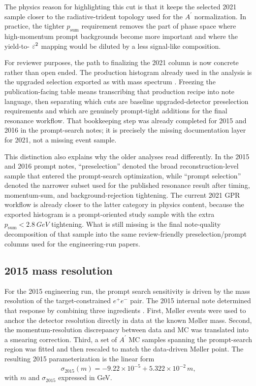 The physics reason for highlighting this cut is that it keeps the selected 2021 sample
closer to the radiative-trident topology used for the $A^\prime$ normalization. In
practice, the tighter $p_{\mathrm{sum}}$ requirement removes the part of phase space
where high-momentum prompt backgrounds become more important and where the yield-to-
$\varepsilon^2$ mapping would be diluted by a less signal-like composition.

For reviewer purposes, the path to finalizing the 2021 column is now concrete rather
than open ended. The production histogram already used in the analysis is the upgraded
selection exported as  with mass
spectrum . Freezing the publication-facing table means
transcribing that production recipe into note language, then separating which cuts are
baseline upgraded-detector preselection requirements and which are genuinely
prompt-tight additions for the final resonance workflow. That bookkeeping step was
already completed for 2015 and 2016 in the prompt-search notes; it is precisely the
missing documentation layer for 2021, not a missing event sample.

This distinction also explains why the older analyses read differently. In the 2015 and
2016 prompt notes, ``preselection'' denoted the broad reconstruction-level sample that
entered the prompt-search optimization, while ``prompt selection'' denoted the narrower
subset used for the published resonance result after timing, momentum-sum, and
background-rejection tightening. The current 2021 GPR workflow is already closer to the
latter category in physics content, because the exported histogram is a prompt-oriented
study sample with the extra $p_{\mathrm{sum}}<\SI{2.8}{GeV}$ tightening. What is still
missing is the final note-quality decomposition of that sample into the same
review-friendly preselection/prompt columns used for the engineering-run papers.

\subsection{2015 mass resolution}
\label{sec:massres-2015}

For the 2015 engineering run, the prompt search sensitivity is driven by the mass
resolution of the target-constrained $e^+e^-$ pair. The 2015 internal note determined
that response by combining three ingredients \cite{HPS2015InternalNote}. First, M{\o}ller
events were used to anchor the detector resolution directly in data at the known
M{\o}ller mass. Second, the momentum-resolution discrepancy between data and MC was
translated into a smearing correction. Third, a set of $A^\prime$ MC samples spanning
the prompt-search region was fitted and then rescaled to match the data-driven M{\o}ller
point. The resulting 2015 parameterization is the linear form
\begin{equation}
\sigma_{2015}(m) = -9.22\times10^{-5} + 5.322\times10^{-2}\,m,
\label{eq:sigma2015}
\end{equation}
with $m$ and $\sigma_{2015}$ expressed in GeV.

